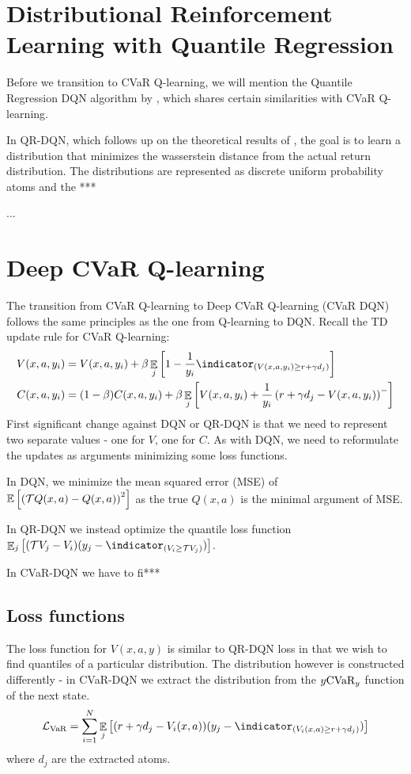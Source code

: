 \section{Distributional Reinforcement Learning with Quantile Regression}
Before we transition to CVaR Q-learning, we will mention the Quantile Regression DQN algorithm by \citet{dabney2017distributional}, which shares certain similarities with CVaR Q-learning.

In QR-DQN, which follows up on the theoretical results of \citet{bellemare2017distributional}, the goal is to learn a distribution that minimizes the wasserstein distance from the actual return distribution. The distributions are represented as discrete uniform probability atoms and the ***

...


\section{Deep CVaR Q-learning}
The transition from CVaR Q-learning to Deep CVaR Q-learning (CVaR DQN) follows the same principles as the one from Q-learning to DQN. Recall the TD update rule for CVaR Q-learning:
\begin{align*}
V(x, a, y_i) &= V(x, a, y_i) + \beta \expect_j\bsquare{1 - \dfrac{1}{y_i}\indicator_{(V(x, a, y_i) \ge r+\gamma d_j)}}\\
C(x, a, y_i) &= (1-\beta)C(x, a, y_i) + \beta\expect_j\bsquare{V(x, a, y_i) + \dfrac{1}{y_i}\bround{r+\gamma d_j - V(x, a, y_i)}^-}
\end{align*}
First significant change against DQN or QR-DQN is that we need to represent two separate values - one for $V$, one for $C$. As with DQN, we need to reformulate the updates as arguments minimizing some loss functions.

In DQN, we minimize the mean squared error (MSE) of $\mathbb{E}\left[ {\left( {\mathcal{T} Q(x, a) - Q(x, a)} \right)^2} \right]$ as the true $Q(x, a)$ is the minimal argument of MSE.

In QR-DQN we instead optimize the quantile loss function $\expect_j\bsquare{(\cT V_j - V_i)(y_j - \indicator_{(V_i \ge \cT V_j)})}$.

In CVaR-DQN we have to fi***


\subsection{Loss functions}
The loss function for $V(x, a, y)$ is similar to QR-DQN loss in that we wish to find quantiles of a particular distribution. The distribution however is constructed differently - in CVaR-DQN we extract the distribution from the $y\text{CVaR}_y$ function of the next state.
\begin{equation}
\mathcal{L}_{\var}=\sum_{i=1}^{N} \expect_j\bsquare{(r + \gamma d_j - V_i(x, a))(y_j - \indicator_{(V_i(x, a) \ge r + \gamma d_j)})}
\end{equation}
where $d_j$ are the extracted atoms.

